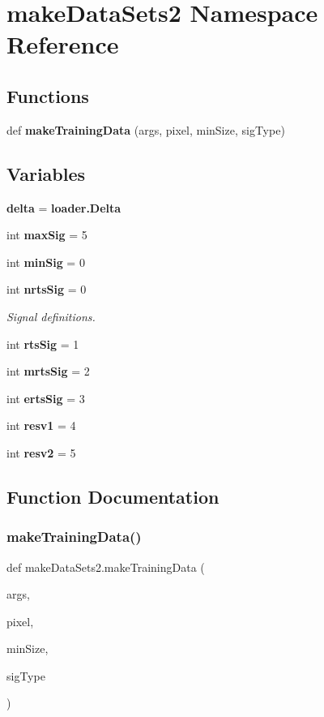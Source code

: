 \section{make\+Data\+Sets2 Namespace Reference}
\label{namespacemake_data_sets2}
\subsection*{Functions}
\begin{DoxyCompactItemize}
\item 
def \textbf{ make\+Training\+Data} (args, pixel, min\+Size, sig\+Type)
\end{DoxyCompactItemize}
\subsection*{Variables}
\begin{DoxyCompactItemize}
\item 
\textbf{ delta} = \textbf{ loader.\+Delta}
\item 
int \textbf{ max\+Sig} = 5
\item 
int \textbf{ min\+Sig} = 0
\item 
int \textbf{ nrts\+Sig} = 0
\begin{DoxyCompactList}\small\item\em Signal definitions. \end{DoxyCompactList}\item 
int \textbf{ rts\+Sig} = 1
\item 
int \textbf{ mrts\+Sig} = 2
\item 
int \textbf{ erts\+Sig} = 3
\item 
int \textbf{ resv1} = 4
\item 
int \textbf{ resv2} = 5
\end{DoxyCompactItemize}


\subsection{Function Documentation}
\mbox{\label{namespacemake_data_sets2_a73e31e2415abdfc1ac559a8e60e91471}} 
\subsubsection{make\+Training\+Data()}
{\footnotesize\ttfamily def make\+Data\+Sets2.\+make\+Training\+Data (\begin{DoxyParamCaption}\item[{}]{args,  }\item[{}]{pixel,  }\item[{}]{min\+Size,  }\item[{}]{sig\+Type }\end{DoxyParamCaption})}



